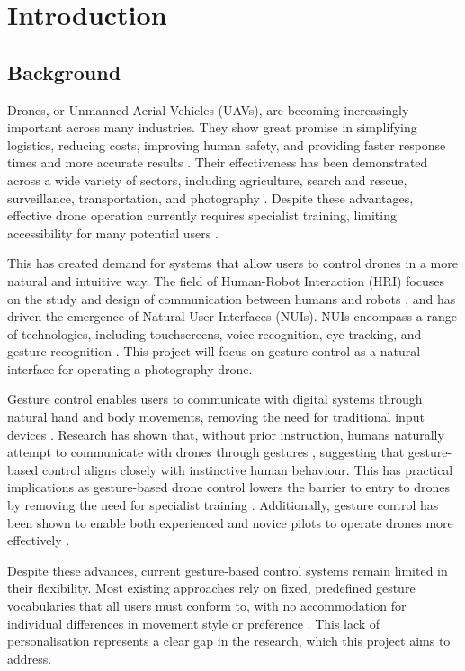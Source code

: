\chapter{Introduction}

\section{Background}

Drones, or Unmanned Aerial Vehicles (UAVs), are becoming increasingly important across many industries. They show great promise in simplifying logistics, reducing costs, improving human safety, and providing faster response times and more accurate results \citep{Patrona2021}. Their effectiveness has been demonstrated across a wide variety of sectors, including agriculture, search and rescue, surveillance, transportation, and photography \citep{DronesInAction2025}. Despite these advantages, effective drone operation currently requires specialist training, limiting accessibility for many potential users \citep{International_journal_of_engineering_research_2017}.

This has created demand for systems that allow users to control drones in a more natural and intuitive way. The field of Human-Robot Interaction (HRI) focuses on the study and design of communication between humans and robots \citep{HRI_sciencedirect}, and has driven the emergence of Natural User Interfaces (NUIs). NUIs encompass a range of technologies, including touchscreens, voice recognition, eye tracking, and gesture recognition \citep{Natural_UI}. This project will focus on gesture control as a natural interface for operating a photography drone.

Gesture control enables users to communicate with digital systems through natural hand and body movements, removing the need for traditional input devices \citep{Anjua2024}. Research has shown that, without prior instruction, humans naturally attempt to communicate with drones through gestures \citep{Gio2021}, suggesting that gesture-based control aligns closely with instinctive human behaviour. This has practical implications as gesture-based drone control lowers the barrier to entry to drones by removing the need for specialist training \citep{Mehta2023}. Additionally, gesture control has been shown to enable both experienced and novice pilots to operate drones more effectively \citep{Gio2021}.

Despite these advances, current gesture-based control systems remain limited in their flexibility. Most existing approaches rely on fixed, predefined gesture vocabularies that all users must conform to, with no accommodation for individual differences in movement style or preference \citep{Reyes2023}. This lack of personalisation represents a clear gap in the research, which this project aims to address.

